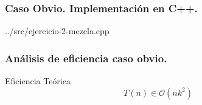 \documentclass[13pt]{beamer}
\begin{document}
	\begin{frame}
		\frametitle{Caso Obvio. Implementación en C++.}
		
		{../src/ejercicio-2-mezcla.cpp} 
	\end{frame}

    \begin{frame}
		\frametitle{Análisis de eficiencia caso obvio.}
		 
		 \begin{block}{Eficiencia Teórica}
		 	$$T(n) \in \mathcal{O}(nk^{2})$$
		 \end{block}
	 
	\end{frame}






	 
\end{document}

